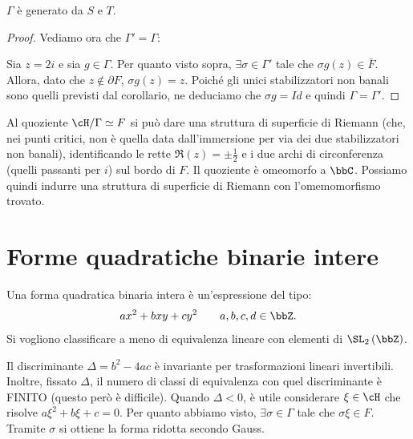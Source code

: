 \begin{teorema}
$\Gamma$ è generato da $S$ e $T$.
\end{teorema}

\begin{proof}
Vediamo ora che $\Gamma'=\Gamma$:

Sia $z=2i$ e sia $g \in \Gamma$. Per quanto visto sopra, $\exists \sigma \in \Gamma'$
tale che $\sigma g(z) \in \bar{F}$. Allora, dato che $z \notin \partial F$,
$\sigma g(z) = z$.
Poiché gli unici stabilizzatori non banali sono quelli
previsti dal corollario, ne deduciamo che $\sigma g = Id$ e quindi $\Gamma = \Gamma'$.
\end{proof}

\begin{osservazione}
  Al quoziente $\cH/\Gamma \simeq F$ si può dare una struttura di superficie di Riemann
  (che, nei punti critici, non è quella data dall'immersione per via dei due stabilizzatori non banali),
  identificando le rette $\Re(z)=\pm \frac{1}{2}$ e i due archi di circonferenza
  (quelli passanti per $i$) sul bordo di $F$. Il quoziente è omeomorfo a $\bbC$.
  Possiamo quindi indurre una struttura di superficie di Riemann con l'omemomorfismo trovato.
\end{osservazione}

\section{Forme quadratiche binarie intere}
Una forma quadratica binaria intera è un'espressione del tipo:
\[
	ax^2+bxy+cy^2 \qquad a,b,c,d \in \bbZ.
\]
Si vogliono classificare a meno di equivalenza lineare con elementi di
$\SL_2 \left( \bbZ \right)$.

\begin{osservazione}
Il discriminante $\Delta = b^2 - 4 a c$ è invariante per trasformazioni lineari
invertibili. Inoltre, fissato $\Delta$, il numero di classi di equivalenza con
quel discriminante è FINITO (questo però è difficile).
Quando $\Delta < 0$, è utile considerare $\xi \in \cH$ che risolve
$a \xi^2 + b \xi + c =0$. Per quanto abbiamo visto, $\exists \sigma \in \Gamma$
tale che $\sigma \xi \in F$. Tramite $\sigma$ si ottiene la forma ridotta secondo
Gauss.
\end{osservazione}

